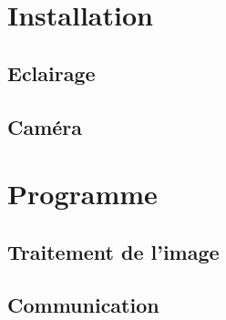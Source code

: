 \section{Installation}
\subsection{Eclairage}

\subsection{Caméra}

\section{Programme}
\subsection{Traitement de l'image}
\subsection{Communication}

